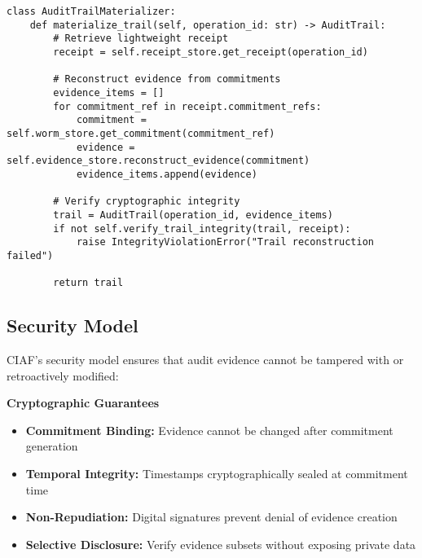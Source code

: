 \documentclass[12pt,a4paper]{article}
\begin{document}
\begin{lstlisting}[caption=Audit Trail Reconstruction Algorithm]
class AuditTrailMaterializer:
    def materialize_trail(self, operation_id: str) -> AuditTrail:
        # Retrieve lightweight receipt
        receipt = self.receipt_store.get_receipt(operation_id)
        
        # Reconstruct evidence from commitments
        evidence_items = []
        for commitment_ref in receipt.commitment_refs:
            commitment = self.worm_store.get_commitment(commitment_ref)
            evidence = self.evidence_store.reconstruct_evidence(commitment)
            evidence_items.append(evidence)
        
        # Verify cryptographic integrity
        trail = AuditTrail(operation_id, evidence_items)
        if not self.verify_trail_integrity(trail, receipt):
            raise IntegrityViolationError("Trail reconstruction failed")
        
        return trail
\end{lstlisting}

\subsection{Security Model}

CIAF's security model ensures that audit evidence cannot be tampered with or retroactively modified:

\begin{valuebox}
\textbf{Cryptographic Guarantees}
\begin{itemize}
\item \textbf{Commitment Binding:} Evidence cannot be changed after commitment generation
\item \textbf{Temporal Integrity:} Timestamps cryptographically sealed at commitment time  
\item \textbf{Non-Repudiation:} Digital signatures prevent denial of evidence creation
\item \textbf{Selective Disclosure:} Verify evidence subsets without exposing private data
\end{itemize}
\end{valuebox}
\end{document}
